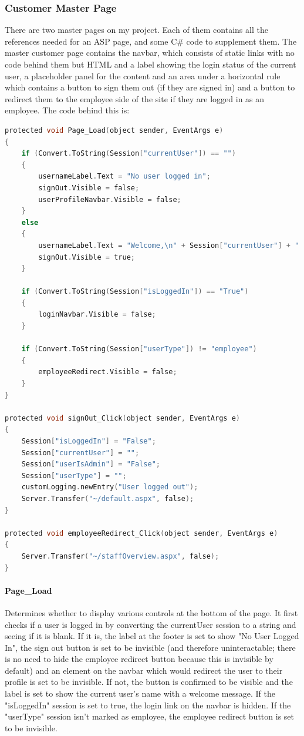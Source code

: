 ﻿\documentclass{article}
\begin{document}
    \subsubsection{Customer Master Page}
    There are two master pages on my project.
    Each of them contains all the references needed for an ASP page, and some C\# code to supplement them.
    The master customer page contains the navbar, which consists of static links with no code behind them but HTML and a label showing the login status of the current user, a placeholder panel for the content and an area under a horizontal rule which contains a button to sign them out (if they are signed in) and a button to redirect them to the employee side of the site if they are logged in as an employee.
    The code behind this is:
    \begin{lstlisting}[language=C]
protected void Page_Load(object sender, EventArgs e)
{
    if (Convert.ToString(Session["currentUser"]) == "")
    {
        usernameLabel.Text = "No user logged in";
        signOut.Visible = false;
        userProfileNavbar.Visible = false;
    }
    else
    {
        usernameLabel.Text = "Welcome,\n" + Session["currentUser"] + "!";
        signOut.Visible = true;
    }

    if (Convert.ToString(Session["isLoggedIn"]) == "True")
    {
        loginNavbar.Visible = false;
    }

    if (Convert.ToString(Session["userType"]) != "employee")
    {
        employeeRedirect.Visible = false;
    }
}

protected void signOut_Click(object sender, EventArgs e)
{
    Session["isLoggedIn"] = "False";
    Session["currentUser"] = "";
    Session["userIsAdmin"] = "False";
    Session["userType"] = "";
    customLogging.newEntry("User logged out");
    Server.Transfer("~/default.aspx", false);
}

protected void employeeRedirect_Click(object sender, EventArgs e)
{
    Server.Transfer("~/staffOverview.aspx", false);
}
    \end{lstlisting}
    \paragraph{Page\_Load} Determines whether to display various controls at the bottom of the page.
    It first checks if a user is logged in by converting the currentUser session to a string and seeing if it is blank.
    If it is, the label at the footer is set to show "No User Logged In", the sign out button is set to be invisible (and therefore uninteractable; there is no need to hide the employee redirect button because this is invisible by default) and an element on the navbar which would redirect the user to their profile is set to be invisible.
    If not, the button is confirmed to be visible and the label is set to show the current user's name with a welcome message.
    If the "isLoggedIn" session is set to true, the login link on the navbar is hidden.
    If the "userType" session isn't marked as employee, the employee redirect button is set to be invisible.
\end{document}
